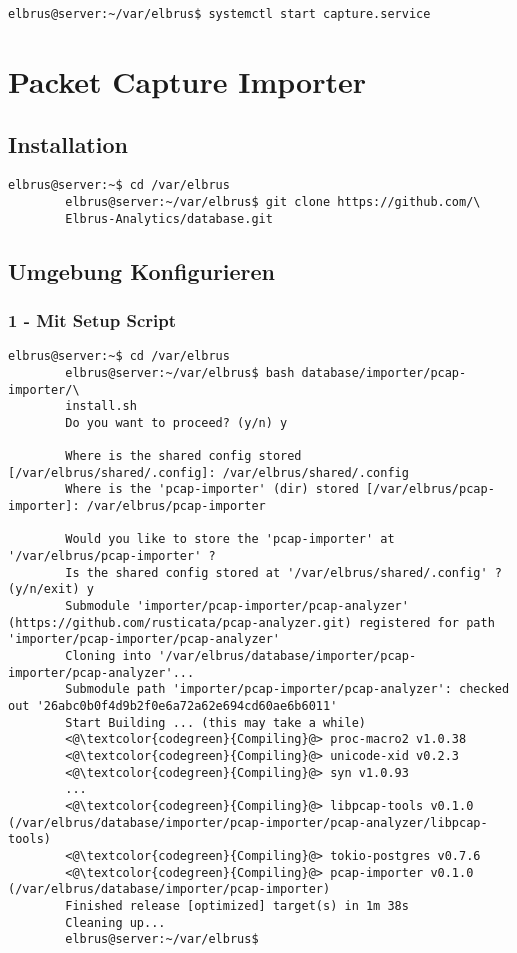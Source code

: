 \documentclass{article}
\begin{document}
	\begin{lstlisting}[caption={Starten des Serviceprogrammes}]
		elbrus@server:~/var/elbrus$ systemctl start capture.service
	\end{lstlisting}
	
	\newpage
	
	
	\section{Packet Capture Importer}
	\subsection{Installation}
	\begin{lstlisting}[caption={Clonen der Software von GitHub.}]
		elbrus@server:~$ cd /var/elbrus
		elbrus@server:~/var/elbrus$ git clone https://github.com/\
		Elbrus-Analytics/database.git
	\end{lstlisting}

	\subsection[file config]{Umgebung Konfigurieren}
	\subsubsection{1 - Mit Setup Script}
	\begin{lstlisting}[caption={Ausführen des setup Scripts}, breaklines=true,]
		elbrus@server:~$ cd /var/elbrus
		elbrus@server:~/var/elbrus$ bash database/importer/pcap-importer/\
		install.sh
		Do you want to proceed? (y/n) y
		
		Where is the shared config stored [/var/elbrus/shared/.config]: /var/elbrus/shared/.config
		Where is the 'pcap-importer' (dir) stored [/var/elbrus/pcap-importer]: /var/elbrus/pcap-importer
		
		Would you like to store the 'pcap-importer' at '/var/elbrus/pcap-importer' ?
		Is the shared config stored at '/var/elbrus/shared/.config' ? (y/n/exit) y
		Submodule 'importer/pcap-importer/pcap-analyzer' (https://github.com/rusticata/pcap-analyzer.git) registered for path 'importer/pcap-importer/pcap-analyzer'
		Cloning into '/var/elbrus/database/importer/pcap-importer/pcap-analyzer'...
		Submodule path 'importer/pcap-importer/pcap-analyzer': checked out '26abc0b0f4d9b2f0e6a72a62e694cd60ae6b6011'
		Start Building ... (this may take a while)
		<@\textcolor{codegreen}{Compiling}@> proc-macro2 v1.0.38
		<@\textcolor{codegreen}{Compiling}@> unicode-xid v0.2.3
		<@\textcolor{codegreen}{Compiling}@> syn v1.0.93
		...
		<@\textcolor{codegreen}{Compiling}@> libpcap-tools v0.1.0 (/var/elbrus/database/importer/pcap-importer/pcap-analyzer/libpcap-tools)
		<@\textcolor{codegreen}{Compiling}@> tokio-postgres v0.7.6
		<@\textcolor{codegreen}{Compiling}@> pcap-importer v0.1.0 (/var/elbrus/database/importer/pcap-importer)
		Finished release [optimized] target(s) in 1m 38s
		Cleaning up...
		elbrus@server:~/var/elbrus$
	\end{lstlisting}
	
\end{document}
